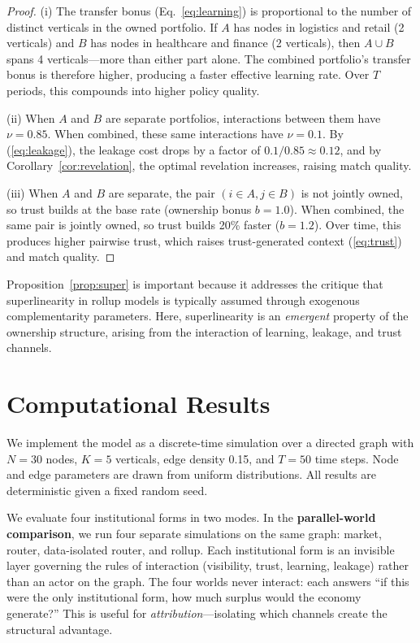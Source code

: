 \documentclass[12pt]{article}
\theoremstyle{definition}
\begin{document}
\begin{proof}
(i) The transfer bonus (Eq.~\ref{eq:learning}) is proportional to the number of distinct verticals in the owned portfolio. If $A$ has nodes in logistics and retail (2 verticals) and $B$ has nodes in healthcare and finance (2 verticals), then $A \cup B$ spans 4 verticals---more than either part alone. The combined portfolio's transfer bonus is therefore higher, producing a faster effective learning rate. Over $T$ periods, this compounds into higher policy quality.

(ii) When $A$ and $B$ are separate portfolios, interactions between them have $\nu = 0.85$. When combined, these same interactions have $\nu = 0.1$. By (\ref{eq:leakage}), the leakage cost drops by a factor of $0.1/0.85 \approx 0.12$, and by Corollary~\ref{cor:revelation}, the optimal revelation increases, raising match quality.

(iii) When $A$ and $B$ are separate, the pair $(i \in A, j \in B)$ is not jointly owned, so trust builds at the base rate (ownership bonus $b = 1.0$). When combined, the same pair is jointly owned, so trust builds 20\% faster ($b = 1.2$). Over time, this produces higher pairwise trust, which raises trust-generated context (\ref{eq:trust}) and match quality.
\end{proof}

\begin{remark}
Proposition~\ref{prop:super} is important because it addresses the critique that superlinearity in rollup models is typically assumed through exogenous complementarity parameters. Here, superlinearity is an \textit{emergent} property of the ownership structure, arising from the interaction of learning, leakage, and trust channels.
\end{remark}

\section{Computational Results}

We implement the model as a discrete-time simulation over a directed graph with $N = 30$ nodes, $K = 5$ verticals, edge density 0.15, and $T = 50$ time steps. Node and edge parameters are drawn from uniform distributions. All results are deterministic given a fixed random seed.

We evaluate four institutional forms in two modes. In the \textbf{parallel-world comparison}, we run four separate simulations on the same graph: market, router, data-isolated router, and rollup. Each institutional form is an invisible layer governing the rules of interaction (visibility, trust, learning, leakage) rather than an actor on the graph. The four worlds never interact: each answers ``if this were the only institutional form, how much surplus would the economy generate?'' This is useful for \textit{attribution}---isolating which channels create the structural advantage.
\end{document}
